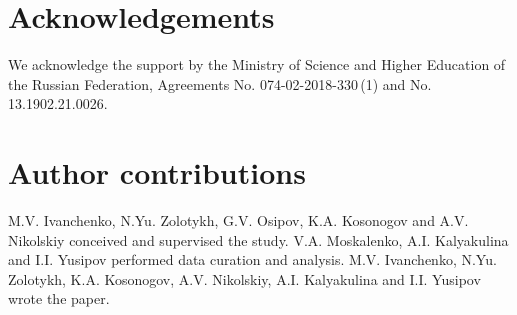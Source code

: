\documentclass[submitted]{ieeeaccess}
\begin{document}
\section*{Acknowledgements}
We acknowledge the support by the Ministry of Science and Higher Education of the Russian Federation, Agreements No. 074-02-2018-330\,(1) and No. 13.1902.21.0026.

\section*{Author contributions}
M.V. Ivanchenko, N.Yu. Zolotykh, G.V. Osipov, K.A. Kosonogov and A.V. Nikolskiy conceived and supervised the study. 
V.A. Moskalenko, A.I. Kalyakulina and I.I. Yusipov performed data curation and analysis. 
M.V. Ivanchenko, N.Yu. Zolotykh, K.A. Kosonogov, A.V. Nikolskiy,  A.I. Kalyakulina and I.I. Yusipov wrote the paper.
\end{document}
